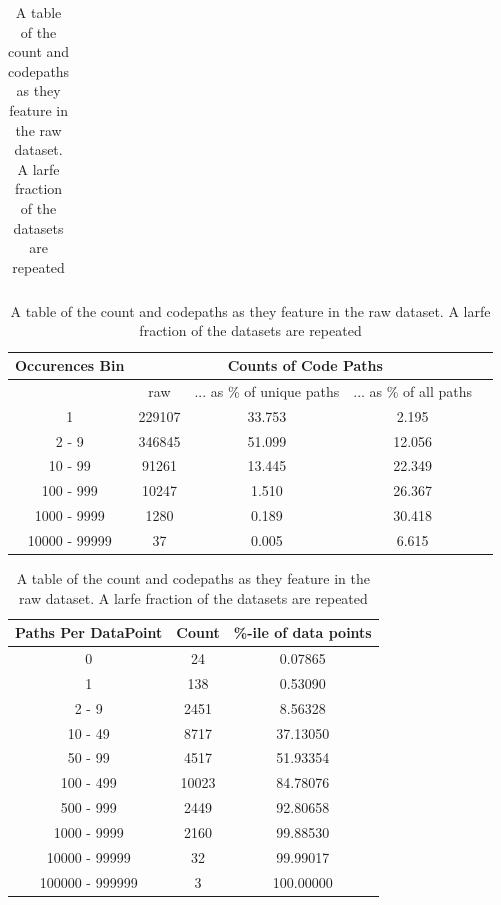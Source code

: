 \begin{table}[p]
\begin{tabular}{c | c | c}
  \end{tabular}
      \caption { The most popular the paths of the the dataset. These only account for a very small amount of the data }
    \label{table:function_histogram} 
    \begin{center}
    \begin{tabular}{c | c | c | c c }       
        Occurences Bin   & \multicolumn{3}{c}{Counts of Code Paths}   \\
        \hline
         &     raw &... as \% of unique paths & ... as \% of all paths   \\  
        \hline     
        1 &     229107 &   33.753 &    2.195  \\                                       
        2 - 9 &     346845 &   51.099 &   12.056  \\                                       
        10 - 99 &   91261 &   13.445 &   22.349  \\                                        
        100 - 999 & 10247 &    1.510 &   26.367    \\                                      
        1000 - 9999 & 1280 &    0.189 &   30.418  \\                                       
        10000 - 99999 &   37 &    0.005 &    6.615   \\                                 
                                                                     
    \end{tabular}
        \caption { A table of the count and codepaths as they feature in the raw dataset. A larfe fraction of the datasets are repeated }
    \label{table:function_histogram} 
    \begin{tabular}{c | c | c  }       
    
   Paths Per DataPoint & Count  &  \%-ile of data points \\  
   \hline
    0 &               24  &     0.07865 \\
    1 &               138  &    0.53090 \\
    2 - 9 &           2451  &   8.56328 \\
    10 - 49 &         8717  &   37.13050 \\
    50 - 99 &         4517  &   51.93354 \\
    100 - 499 &       10023  &  84.78076 \\
    500 - 999 &       2449  &   92.80658 \\
    1000 - 9999 &     2160  &   99.88530 \\
    10000 - 99999 &   32  &     99.99017 \\
    100000 - 999999 & 3  &      100.00000 \\


\end{tabular}
\end{center}
\end{table}
